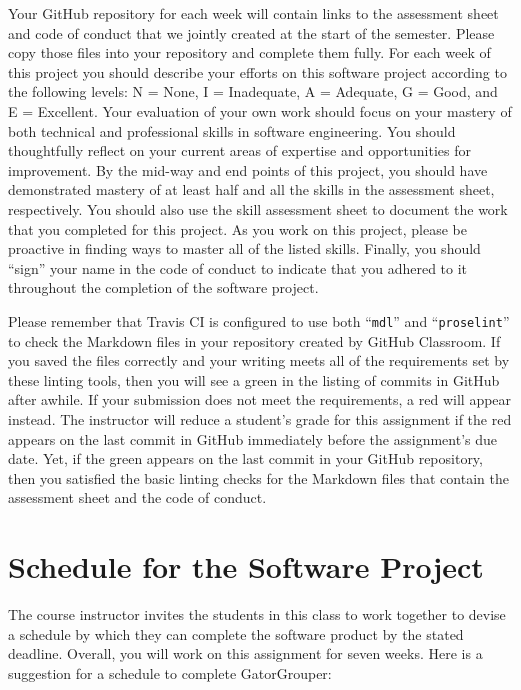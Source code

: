 \documentclass[11pt]{article}
\newcommand{\command}[1]{``\lstinline{#1}''}
\newcommand{\checkmark}{\ding{51}}
\newcommand{\naughtmark}{\ding{55}}
\begin{document}
Your GitHub repository for each week will contain links to the assessment sheet
and code of conduct that we jointly created at the start of the semester. Please
copy those files into your repository and complete them fully. For each week of
this project you should describe your efforts on this software project according
to the following levels: N = None, I = Inadequate, A = Adequate, G = Good, and E
= Excellent. Your evaluation of your own work should focus on your mastery of
both technical and professional skills in software engineering. You should
thoughtfully reflect on your current areas of expertise and opportunities for
improvement. By the mid-way and end points of this project, you should have
demonstrated mastery of at least half and all the skills in the assessment
sheet, respectively. You should also use the skill assessment sheet to document
the work that you completed for this project. As you work on this project,
please be proactive in finding ways to master all of the listed skills. Finally,
you should ``sign'' your name in the code of conduct to indicate that you
adhered to it throughout the completion of the software project.


Please remember that Travis CI is configured to use both \command{mdl} and
\command{proselint} to check the Markdown files in your repository created by
GitHub Classroom.
%
If you saved the files correctly and your writing meets all of the requirements
set by these linting tools, then you will see a green \checkmark{} in the
listing of commits in GitHub after awhile. If your submission does not meet the
requirements, a red \naughtmark{} will appear instead. The instructor will
reduce a student's grade for this assignment if the red \naughtmark{} appears on
the last commit in GitHub immediately before the assignment's due date. Yet, if
the green \checkmark{} appears on the last commit in your GitHub repository,
then you satisfied the basic linting checks for the Markdown files that contain
the assessment sheet and the code of conduct.

\section*{Schedule for the Software Project}

The course instructor invites the students in this class to work together to
devise a schedule by which they can complete the software product by the stated
deadline. Overall, you will work on this assignment for seven weeks. Here is a
suggestion for a schedule to complete GatorGrouper:
\end{document}
